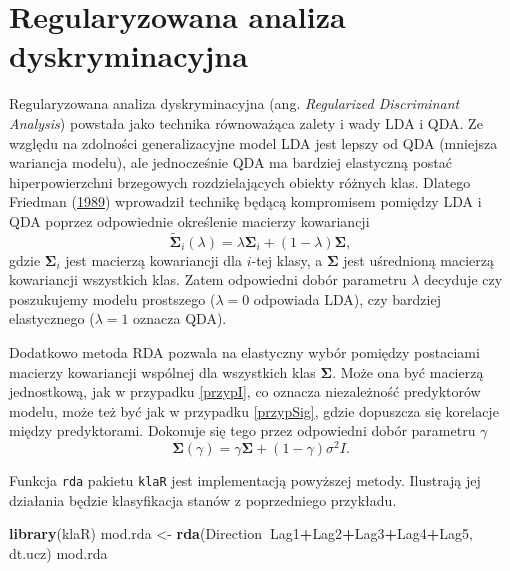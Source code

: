 \documentclass[
]{book}
\newenvironment{Shaded}{\begin{snugshade}}{\end{snugshade}}
\newcommand{\KeywordTok}[1]{\textcolor[rgb]{0.13,0.29,0.53}{\textbf{#1}}}
\newcommand{\NormalTok}[1]{#1}
\newcommand{\OperatorTok}[1]{\textcolor[rgb]{0.81,0.36,0.00}{\textbf{#1}}}
\newcommand{\StringTok}[1]{\textcolor[rgb]{0.31,0.60,0.02}{#1}}
\theoremstyle{plain}
\theoremstyle{definition}
\theoremstyle{definition}
\theoremstyle{definition}
\theoremstyle{definition}
\theoremstyle{remark}
\let\BeginKnitrBlock\begin \let\EndKnitrBlock\end
\begin{document}
\hypertarget{regularyzowana-analiza-dyskryminacyjna}{%
\section{Regularyzowana analiza dyskryminacyjna}\label{regularyzowana-analiza-dyskryminacyjna}}

Regularyzowana analiza dyskryminacyjna (ang. \emph{Regularized Discriminant Analysis}) powstała jako technika równoważąca zalety i wady LDA i QDA. Ze względu na zdolności generalizacyjne model LDA jest lepszy od QDA (mniejsza wariancja modelu), ale jednocześnie QDA ma bardziej elastyczną postać hiperpowierzchni brzegowych rozdzielających obiekty różnych klas. Dlatego Friedman (\protect\hyperlink{ref-friedman1989}{1989}) wprowadził technikę będącą kompromisem pomiędzy LDA i QDA poprzez odpowiednie określenie macierzy kowariancji
\begin{equation}
    \tilde{\boldsymbol \Sigma}_i(\lambda) = \lambda\boldsymbol\Sigma_i + (1-\lambda)\boldsymbol\Sigma,
\end{equation}
gdzie \(\boldsymbol \Sigma_i\) jest macierzą kowariancji dla \(i\)-tej klasy, a \(\boldsymbol \Sigma\) jest uśrednioną macierzą kowariancji wszystkich klas. Zatem odpowiedni dobór parametru \(\lambda\) decyduje czy poszukujemy modelu prostszego (\(\lambda = 0\) odpowiada LDA), czy bardziej elastycznego (\(\lambda=1\) oznacza QDA).

Dodatkowo metoda RDA pozwala na elastyczny wybór pomiędzy postaciami macierzy kowariancji wspólnej dla wszystkich klas \(\boldsymbol\Sigma\). Może ona być macierzą jednostkową, jak w przypadku \ref{przypI}, co oznacza niezależność predyktorów modelu, może też być jak w przypadku \ref{przypSig}, gdzie dopuszcza się korelacje między predyktorami. Dokonuje się tego przez odpowiedni dobór parametru \(\gamma\)
\begin{equation}
    \boldsymbol \Sigma(\gamma) = \gamma\boldsymbol \Sigma+(1-\gamma)\sigma^2I.
\end{equation}

\BeginKnitrBlock{example}
\protect\hypertarget{exm:rda}{}{\label{exm:rda} }Funkcja \texttt{rda} pakietu \texttt{klaR} jest implementacją powyższej metody. Ilustrają jej działania będzie klasyfikacja stanów z poprzedniego przykładu.
\EndKnitrBlock{example}

\begin{Shaded}
\begin{Highlighting}[]
\KeywordTok{library}\NormalTok{(klaR)}
\NormalTok{mod.rda <-}\StringTok{ }\KeywordTok{rda}\NormalTok{(Direction}\OperatorTok{~}\NormalTok{Lag1}\OperatorTok{+}\NormalTok{Lag2}\OperatorTok{+}\NormalTok{Lag3}\OperatorTok{+}\NormalTok{Lag4}\OperatorTok{+}\NormalTok{Lag5, dt.ucz)}
\NormalTok{mod.rda}
\end{Highlighting}
\end{Shaded}
\end{document}
